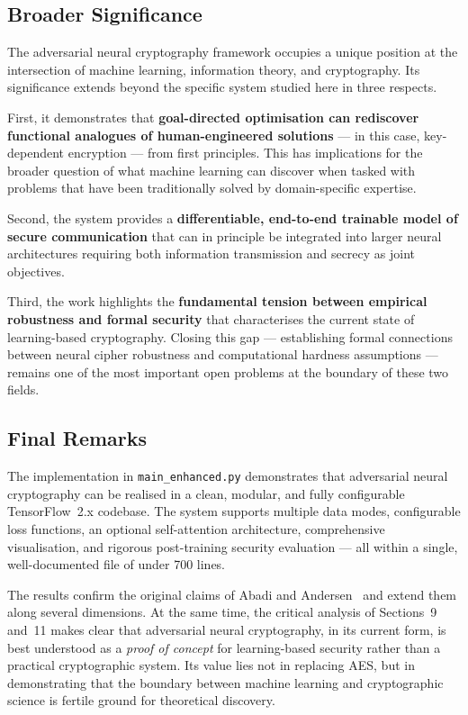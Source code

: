 \documentclass[12pt, a4paper]{article}
\newcommand{\code}[1]{\texttt{\color{CodeRed}#1}}
\begin{document}
\subsection{Broader Significance}
\label{subsec:significance}

The adversarial neural cryptography framework occupies a unique position
at the intersection of machine learning, information theory, and
cryptography. Its significance extends beyond the specific system
studied here in three respects.

First, it demonstrates that \textbf{goal-directed optimisation can
rediscover functional analogues of human-engineered solutions} ---
in this case, key-dependent encryption --- from first principles.
This has implications for the broader question of what machine learning
can discover when tasked with problems that have been traditionally
solved by domain-specific expertise.

Second, the system provides a \textbf{differentiable, end-to-end
trainable model of secure communication} that can in principle be
integrated into larger neural architectures requiring both information
transmission and secrecy as joint objectives.

Third, the work highlights the \textbf{fundamental tension between
empirical robustness and formal security} that characterises the
current state of learning-based cryptography. Closing this gap ---
establishing formal connections between neural cipher robustness and
computational hardness assumptions --- remains one of the most
important open problems at the boundary of these two fields.

\subsection{Final Remarks}
\label{subsec:final_remarks}

The implementation in \code{main\_enhanced.py} demonstrates that
adversarial neural cryptography can be realised in a clean,
modular, and fully configurable TensorFlow~2.x codebase. The
system supports multiple data modes, configurable loss functions,
an optional self-attention architecture, comprehensive visualisation,
and rigorous post-training security evaluation --- all within a
single, well-documented file of under 700 lines.

The results confirm the original claims of Abadi and
Andersen~\cite{abadi2016learning} and extend them along several
dimensions. At the same time, the critical analysis of Sections~9
and~11 makes clear that adversarial neural cryptography, in its
current form, is best understood as a \emph{proof of concept} for
learning-based security rather than a practical cryptographic
system. Its value lies not in replacing AES, but in demonstrating
that the boundary between machine learning and cryptographic science
is fertile ground for theoretical discovery.
\end{document}
